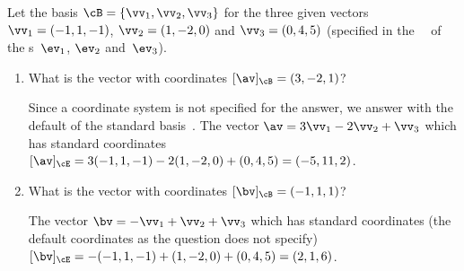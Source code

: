 \begin{example} \label{eg:}
Let the basis \(\cB=\{\vv_1,\vv_2,\vv_3\}\) for the three given vectors \(\vv_1=(-1,1,-1)\), \(\vv_2=(1,-2,0)\) and \(\vv_3=(0,4,5)\) (specified in the ~\cE\ of the s~\(\ev_1\), \(\ev_2\) and~\(\ev_3\)).
\begin{enumerate}
\item What is the vector with coordinates \([\av]_\cB=(3,-2,1)\)?
\begin{solution} 
Since a coordinate system is not specified for the answer, we answer with the default of the standard basis~\cE.
The vector \(\av=3\vv_1-2\vv_2+\vv_3\) which has standard coordinates 
\([\av]_\cE=3(-1,1,-1)-2(1,-2,0)+(0,4,5)=(-5,11,2)\).
\end{solution}

\item What is the vector with coordinates \([\bv]_\cB=(-1,1,1)\)?
\begin{solution} 
The vector \(\bv=-\vv_1+\vv_2+\vv_3\) which has standard coordinates (the default coordinates as the question does not specify) 
\([\bv]_\cE=-(-1,1,-1)+(1,-2,0)+(0,4,5)=(2,1,6)\).
\end{solution}


\end{enumerate}
\end{example}
